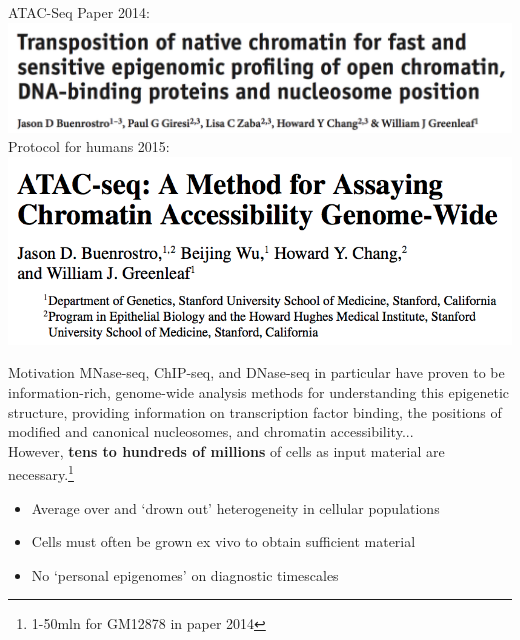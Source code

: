 \documentclass{beamer}
\begin{document}
\begin{frame}{ATAC-Seq}
Paper 2014:\\
\includegraphics[width=\linewidth]{atac.png}\\
Protocol for humans 2015:\\
\includegraphics[width=\linewidth]{atac_protocol.png}\\
\end{frame}

\begin{frame}{Motivation}
MNase-seq, ChIP-seq, and DNase-seq in particular have proven to be information-rich, genome-wide analysis methods for understanding this epigenetic structure, providing information on transcription factor binding, the positions of modified and canonical nucleosomes, and chromatin accessibility...\\
However, \textbf{tens to hundreds of millions} of cells as input material are necessary.\footnote{1-50mln for GM12878 in paper 2014}\\

\begin{itemize}
\item Average over and ‘drown out’ heterogeneity in cellular populations
\item Cells must often be grown ex vivo to obtain sufficient material
\item No ‘personal epigenomes’ on diagnostic timescales
\end{itemize}
\end{frame}
\end{document}
